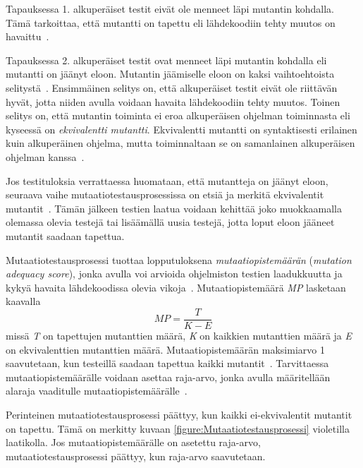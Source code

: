 \documentclass[finnish, grading]{tktltiki2}
\theoremstyle{definition}
\theoremstyle{remark}
\begin{document}
Tapauksessa 1. alkuperäiset testit eivät ole menneet läpi mutantin kohdalla. Tämä tarkoittaa, että mutantti on tapettu eli lähdekoodiin tehty muutos on havaittu~\cite[s. 36]{DeMillo:Lipton:Sayward:1978}.

Tapauksessa 2. alkuperäiset testit ovat menneet läpi mutantin kohdalla eli mutantti on jäänyt eloon. Mutantin jäämiselle eloon on kaksi vaihtoehtoista selitystä~\cite[s. 36]{DeMillo:Lipton:Sayward:1978}. Ensimmäinen selitys on, että alkuperäiset testit eivät ole riittävän hyvät, jotta niiden avulla voidaan havaita lähdekoodiin tehty muutos. Toinen selitys on, että mutantin toiminta ei eroa alkuperäisen ohjelman toiminnasta eli kyseessä on \textit{ekvivalentti mutantti}. Ekvivalentti mutantti on syntaktisesti erilainen kuin alkuperäinen ohjelma, mutta toiminnaltaan se on samanlainen alkuperäisen ohjelman kanssa~\cite[s. 652]{Jia:Harman:2011}.

Jos testituloksia verrattaessa huomataan, että mutantteja on jäänyt eloon, seuraava vaihe mutaatiotestausprosessissa on etsiä ja merkitä ekvivalentit mutantit~\cite[s. 36]{Offutt:Untch:2001}. Tämän jälkeen testien laatua voidaan kehittää joko muokkaamalla olemassa olevia testejä tai lisäämällä uusia testejä, jotta loput eloon jääneet mutantit saadaan tapettua.

Mutaatiotestausprosessi tuottaa lopputuloksena \textit{mutaatiopistemäärän} (\textit{mutation adequacy score}), jonka avulla voi arvioida ohjelmiston testien laadukkuutta ja kykyä havaita lähdekoodissa olevia vikoja~\cite[s. 652]{Jia:Harman:2011}. Mutaatiopistemäärä \textit{MP} lasketaan kaavalla 
\begin{equation}
MP = \frac{T}{K - E}
\end{equation}
missä \textit{T} on tapettujen mutanttien määrä, \textit{K} on kaikkien mutanttien määrä ja \textit{E} on ekvivalenttien mutanttien määrä. Mutaatiopistemäärän maksimiarvo 1 saavutetaan, kun testeillä saadaan tapettua kaikki mutantit~\cite[s. 36]{Offutt:Untch:2001}. Tarvittaessa mutaatiopistemäärälle voidaan asettaa raja-arvo, jonka avulla määritellään alaraja vaaditulle mutaatiopistemäärälle~\cite[s. 36]{Offutt:Untch:2001}. 

Perinteinen mutaatiotestausprosessi päättyy, kun kaikki ei-ekvivalentit mutantit on tapettu. Tämä on merkitty kuvaan \ref{figure:Mutaatiotestausprosessi} violetilla laatikolla. Jos mutaatiopistemäärälle on asetettu raja-arvo, mutaatiotestausprosessi päättyy, kun raja-arvo saavutetaan.
\end{document}
